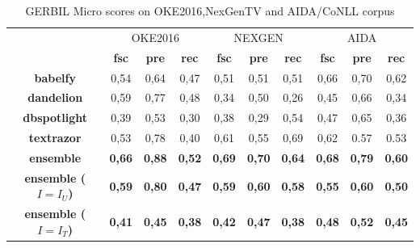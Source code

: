 \documentclass{llncs}
\begin{document}
\begin{table}[p]
      \centering
      \setlength{\tabcolsep}{5pt}
        \begin{tabular}{c|c|c|c|c|c|c|c|c|c|}
          \multicolumn{1}{c}{ } &
          \multicolumn{3}{|c|}{OKE2016} & 
          \multicolumn{3}{|c|}{NEXGEN} &
          \multicolumn{3}{|c|}{AIDA}\\
           \multicolumn{1}{c|}{ } & \textbf{fsc} & \textbf{pre} & \textbf{rec}
           & \textbf{fsc} & \textbf{pre} & \textbf{rec} & \textbf{fsc} & \textbf{pre} & \textbf{rec} \\ \hline
            \textbf{babelfy}         & 0,54  & 0,64   & 0,47  & 0,51  & 0,51 & 0,51 & 0,66 & 0,70 & 0,62  \\ \hline
            \textbf{dandelion}       & 0,59   & 0,77   & 0,48 & 0,34  & 0,50  & 0,26 & 0,45   & 0,66   & 0,34\\ \hline
            \textbf{dbspotlight}     & 0,39   & 0,53   & 0,30 & 0,38   & 0,29  & 0,54 & 0,47	& 0,65 & 0,36 \\ \hline
            \textbf{textrazor}       & 0,53   & 0,78   & 0,40 & 0,61  & 0,55  & 0,69 & 0,62 & 0.57 & 0.53\\ \hline \hline
            \textbf{ensemble}        & \textbf{0,66}   & \textbf{0,88}   & \textbf{0,52}  & \textbf{0,69} & \textbf{0,70}  & \textbf{0,64} & \textbf{0,68}   & \textbf{0,79}   & \textbf{0,60} \\ \hline
            \textbf{ensemble ($I=I_U$)}        & \textbf{0,59}   & \textbf{0,80}   & \textbf{0,47}  & \textbf{0,59} & \textbf{0,60}  & \textbf{0,58} 
            & \textbf{0,55}   & \textbf{0,60}   & \textbf{0,50} \\ \hline
            \textbf{ensemble ($I=I_T$)}        & \textbf{0,41}   & \textbf{0,45}   & \textbf{0,38}  & \textbf{0,42} & \textbf{0,47}  & \textbf{0,38} 
            & \textbf{0,48}   & \textbf{0,52}   & \textbf{0,45} \\ \hline
        \end{tabular}
    \caption{GERBIL Micro scores on OKE2016,NexGenTV and AIDA/CoNLL corpus}
    \label{linkscoresmicro}
\end{table}
\end{document}
